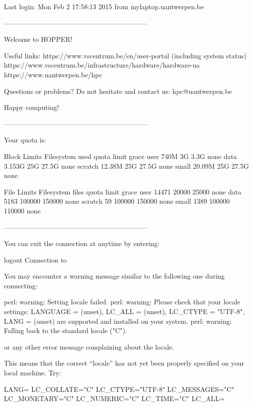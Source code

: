 \begin{prompt}
Last login: Mon Feb  2 17:58:13 2015 from mylaptop.uantwerpen.be

---------------------------------------------------------------

Welcome to HOPPER!

Useful links:
  https://www.vscentrum.be/en/user-portal (including system status)
  https://www.vscentrum.be/infrastructure/hardware/hardware-ua
  https://www.uantwerpen.be/hpc

Questions or problems? Do not hesitate and contact us:
  hpc@uantwerpen.be

Happy computing!

---------------------------------------------------------------

Your quota is:

                   Block Limits
   Filesystem       used      quota      limit    grace
   user             740M         3G       3.3G     none
   data           3.153G        25G      27.5G     none
   scratch        12.38M        25G      27.5G     none
   small          20.09M        25G      27.5G     none

                   File Limits
   Filesystem      files      quota      limit    grace
   user            14471      20000      25000     none
   data             5183     100000     150000     none
   scratch            59     100000     150000     none
   small            1389     100000     110000     none

---------------------------------------------------------------

\end{prompt}
\fi  %

You can exit the connection at anytime by entering:

\begin{prompt}
logout
Connection to %
\end{prompt}

\begin{tip}

You may encounter a warning message similar to the following one during connecting:

\begin{prompt}
perl: warning: Setting locale failed.
perl: warning: Please check that your locale settings:
LANGUAGE = (unset),
LC_ALL = (unset),
LC_CTYPE = "UTF-8",
LANG = (unset)
    are supported and installed on your system.
perl: warning: Falling back to the standard locale ("C").
\end{prompt}

or any other error message complaining about the locale.

This means that the correct ``locale'' has not yet been properly specified on
your local machine. Try:

\begin{prompt}
LANG=
LC_COLLATE="C"
LC_CTYPE="UTF-8"
LC_MESSAGES="C"
LC_MONETARY="C"
LC_NUMERIC="C"
LC_TIME="C"
LC_ALL=
\end{prompt}
\end{tip}

